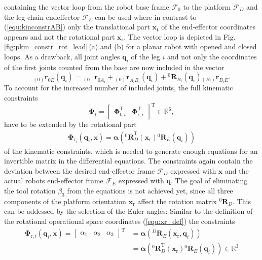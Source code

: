 \documentclass[robotics,article,submit,moreauthors,pdftex]{Definitions/mdpi}
\newcommand{\bm}[1]{\boldsymbol{#1}}
\newcommand{\ortvek}[4]{{ }_{(#1)}{\boldsymbol{#2}}^{#3}_{#4} }
\newcommand{\rotmat}[2]{{{ }^{#1}\boldsymbol{R}}_{#2}}
\newcommand{\transp}[0]{{\mathrm{T}}}
\newcommand{\ks}[1]{{\mathcal{F}}_{#1}}
\begin{document}
%
containing the vector loop from the robot base frame $\ks{0}$ to the platform $\ks{D}$ and the leg chain endeffector $\ks{E}$ can be used where in contrast to (\ref{equ:kinconstrAB}) only the translational part $\bm{x}_{\mathrm{t}}$ of the end-effector coordinates appears and not the rotational part $\bm{x}_{\mathrm{r}}$.
The vector loop is depicted in Fig.\,\ref{fig:pkm_constr_rot_lead}\,(a) and (b) for a planar robot with opened and closed loops.
As a drawback, all joint angles $\bm{q}_i$ of the leg $i$ and not only the coordinates of the first joints counted from the base are now included in the vector
%
\begin{equation}
\ortvek{0}{r}{}{0E}(\bm{q}_i) = 
\ortvek{0}{r}{}{0A_i}
+ \ortvek{0}{r}{}{A_iB_i}(\bm{q}_i) + \rotmat{0}{B_i}(\bm{q}_i) \ortvek{B_i}{r}{}{B_iE}.
\end{equation}
%
To account for the increased number of included joints, the full kinematic constraints
%
\begin{equation}
\bm{\Phi}_i=\begin{bmatrix}
\bm{\Phi}_{\mathrm{t},i}^\transp & \bm{\Phi}_{\mathrm{r},i}^\transp
\end{bmatrix}^\transp \in {\mathbb{R}}^{6},
\label{equ:Phi_def}
\end{equation}
%
have to be extended by the rotational part
%
\begin{align}
\bm{\Phi}_{\mathrm{r}_i}(\bm{q}_i,\bm{x})
=\bm{\alpha}\left(\rotmat{0}{D}^\transp (\bm{x}_{\mathrm{r}})\rotmat{0}{E}(\bm{q}_i)\right)
\end{align}
%
of the kinematic constraints, which is needed to generate enough equations for an invertible matrix in the differential equations.
The constraints again contain the deviation between the desired end-effector frame $\ks{D}$ expressed with $\bm{x}$ and the actual robots end-effector frame $\ks{E}$ expressed with $\bm{q}$.
The goal of eliminating the tool rotation $\beta_3$ from the equations is not achieved yet, since all three components of the platform orientation $\bm{x}_\mathrm{r}$ affect the rotation matrix $\rotmat{0}{D}$. This can be addessed by the selection of the Euler angles:
Similar to the definition of the rotational operational space coordinates (\ref{equ:xr_def}) the constraints 
%
\begin{align}
\bm{\Phi}_{\mathrm{r},i}(\bm{q}_i,\bm{x}) 
= \begin{bmatrix}
\alpha_1  & \alpha_2 & \alpha_3
\end{bmatrix}^\transp
&=\bm{\alpha}\left(\rotmat{D}{E}(\bm{x}_{\mathrm{r}},\bm{q}_i)\right)\nonumber \\
&=\bm{\alpha}\left(\rotmat{0}{D}^\transp (\bm{x}_{\mathrm{r}})\rotmat{0}{E}(\bm{q}_i)\right) \in {\mathbb{R}}^{3}
\label{equ:Phir_def}
\end{align}
\end{document}
